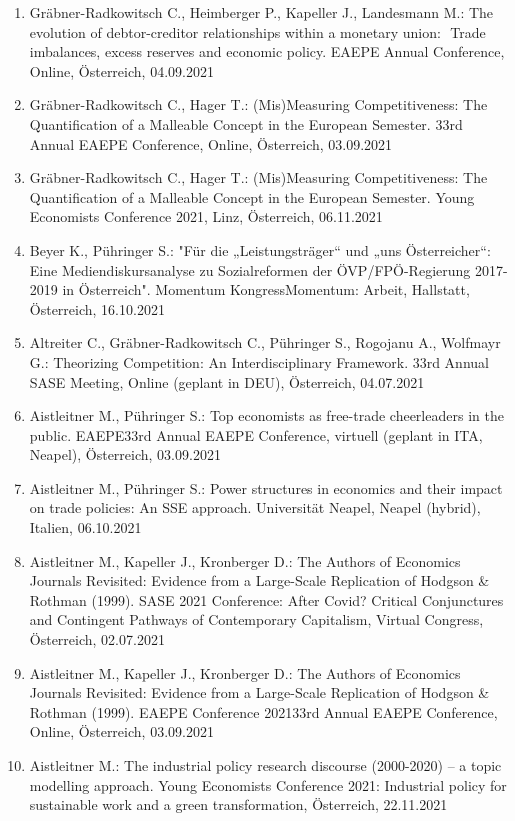 \begin{enumerate}
	\item Gräbner-Radkowitsch C., Heimberger P., Kapeller J., Landesmann M.: The evolution of debtor-creditor relationships within a monetary union:  Trade imbalances, excess reserves and economic policy. EAEPE Annual Conference, Online, Österreich, 04.09.2021
	\item Gräbner-Radkowitsch C., Hager T.: (Mis)Measuring Competitiveness: The Quantification of a Malleable Concept in the European Semester. 33rd Annual EAEPE Conference, Online, Österreich, 03.09.2021
	\item Gräbner-Radkowitsch C., Hager T.: (Mis)Measuring Competitiveness:  The Quantification of a Malleable Concept in the European Semester. Young Economists Conference 2021, Linz, Österreich, 06.11.2021
	\item Beyer K., Pühringer S.: "Für die „Leistungsträger“ und „uns Österreicher“: Eine Mediendiskursanalyse zu Sozialreformen der ÖVP/FPÖ-Regierung 2017-2019 in Österreich". Momentum KongressMomentum: Arbeit, Hallstatt, Österreich, 16.10.2021
	\item Altreiter C., Gräbner-Radkowitsch C., Pühringer S., Rogojanu A., Wolfmayr G.: Theorizing Competition: An Interdisciplinary Framework. 33rd Annual SASE Meeting, Online (geplant in DEU), Österreich, 04.07.2021
	\item Aistleitner M., Pühringer S.: Top economists as free-trade cheerleaders in the public. EAEPE33rd Annual EAEPE Conference, virtuell (geplant in ITA, Neapel), Österreich, 03.09.2021
	\item Aistleitner M., Pühringer S.: Power structures in economics and their impact on trade policies: An SSE approach. Universität Neapel, Neapel (hybrid), Italien, 06.10.2021
	\item Aistleitner M., Kapeller J., Kronberger D.: The Authors of Economics Journals Revisited: Evidence from a Large-Scale Replication of Hodgson \& Rothman (1999). SASE 2021 Conference: After Covid? Critical Conjunctures and Contingent Pathways of Contemporary Capitalism, Virtual Congress, Österreich, 02.07.2021
	\item Aistleitner M., Kapeller J., Kronberger D.: The Authors of Economics Journals Revisited: Evidence from a Large-Scale Replication of Hodgson \& Rothman (1999). EAEPE Conference 202133rd Annual EAEPE Conference, Online, Österreich, 03.09.2021
	\item Aistleitner M.: The industrial policy research discourse (2000-2020) – a topic modelling approach. Young Economists Conference 2021: Industrial policy for sustainable work and a green transformation, Österreich, 22.11.2021
\end{enumerate}

